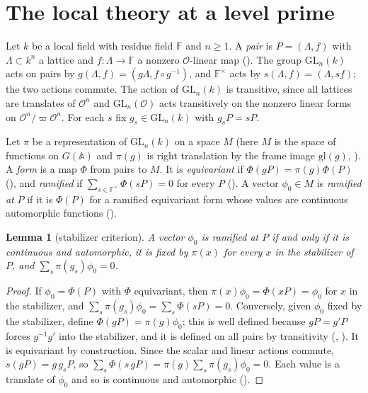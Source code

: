 \documentclass[11pt]{article}
\newcommand{\Ok}{\mathcal O}
\newcommand{\GL}{\mathrm{GL}}
\newcommand{\Fq}{\mathbb F}
\newtheorem{lemma}[theorem]{Lemma}
\theoremstyle{definition}
\theoremstyle{remark}
\begin{document}
\section{The local theory at a level prime}

Let $k$ be a local field with residue field $\Fq$ and $n\ge1$. A \emph{pair} is $P=(\Lambda,f)$ with $\Lambda\subset k^n$ a lattice and $f\colon\Lambda\to\Fq$ a nonzero $\Ok$-linear map (). The group $\GL_n(k)$ acts on pairs by $g(\Lambda,f)=(g\Lambda,f\circ g^{-1})$, and $\Fq^\times$ acts by $s(\Lambda,f)=(\Lambda,sf)$; the two actions commute. The action of $\GL_n(k)$ is transitive, since all lattices are translates of $\Ok^n$ and $\GL_n(\Ok)$ acts transitively on the nonzero linear forms on $\Ok^n/\varpi\Ok^n$. For each $s$ fix $g_s\in\GL_n(k)$ with $g_sP=sP$.

Let $\pi$ be a representation of $\GL_n(k)$ on a space $M$ (here $M$ is the space of functions on $G(\mathbb A)$ and $\pi(g)$ is right translation by the frame image $\mathrm{gl}(g)$, ). A \emph{form} is a map $\Phi$ from pairs to $M$. It is \emph{equivariant} if $\Phi(gP)=\pi(g)\Phi(P)$ (), and \emph{ramified} if $\sum_{s\in\Fq^\times}\Phi(sP)=0$ for every $P$ (). A vector $\phi_0\in M$ is \emph{ramified at} $P$ if it is $\Phi(P)$ for a ramified equivariant form whose values are continuous automorphic functions ().

\begin{lemma}[stabilizer criterion]\label{lem:R1}
A vector $\phi_0$ is ramified at $P$ if and only if it is continuous and automorphic, it is fixed by $\pi(x)$ for every $x$ in the stabilizer of $P$, and $\sum_{s}\pi(g_s)\phi_0=0$.
\end{lemma}

\begin{proof}
If $\phi_0=\Phi(P)$ with $\Phi$ equivariant, then $\pi(x)\phi_0=\Phi(xP)=\phi_0$ for $x$ in the stabilizer, and $\sum_s\pi(g_s)\phi_0=\sum_s\Phi(sP)=0$. Conversely, given $\phi_0$ fixed by the stabilizer, define $\Phi(gP)=\pi(g)\phi_0$; this is well defined because $gP=g'P$ forces $g^{-1}g'$ into the stabilizer, and it is defined on all pairs by transitivity (, ). It is equivariant by construction. Since the scalar and linear actions commute, $s(gP)=g\,g_sP$, so $\sum_s\Phi(s\,gP)=\pi(g)\sum_s\pi(g_s)\phi_0=0$. Each value is a translate of $\phi_0$ and so is continuous and automorphic ().
\end{proof}
\end{document}
